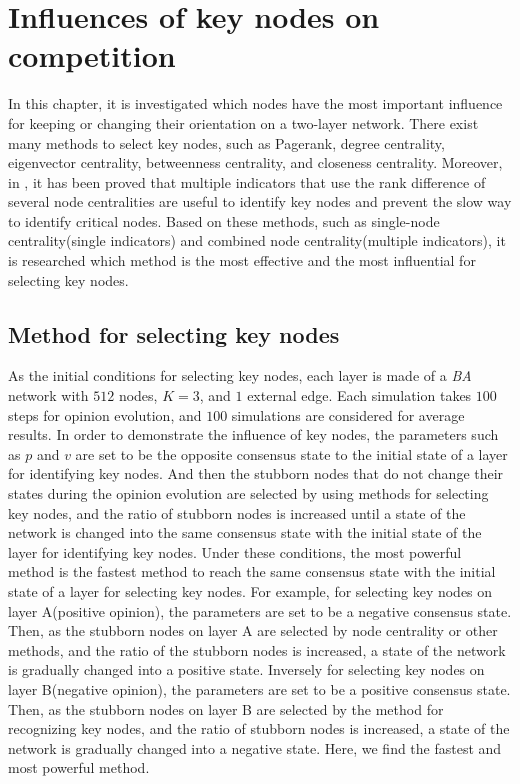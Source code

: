 
\chapter{Influences of key nodes on competition}
\label{chap5}
In this chapter, it is investigated which nodes have the most important influence for keeping or changing their orientation on a two-layer network. There exist many methods to select key nodes, such as Pagerank, degree centrality, eigenvector centrality, betweenness centrality, and closeness centrality. Moreover, in \parencite{mesgari2015, huang2014}, it has been proved that multiple indicators that use the rank difference of several node centralities are useful to identify key nodes and prevent the slow way to identify critical nodes. Based on these methods, such as single-node centrality(single indicators) and combined node centrality(multiple indicators), it is researched which method is the most effective and the most influential for selecting key nodes.  

\section{Method for selecting key nodes}
\label{sec:method for finding key nodes}
As the initial conditions for selecting key nodes, each layer is made of a \textit{BA} network with $512$ nodes, $K=3$, and $1$ external edge. Each simulation takes $100$ steps for opinion evolution, and $100$ simulations are considered for average results. In order to demonstrate the influence of key nodes, the parameters such as $p$ and $v$ are set to be the opposite consensus state to the initial state of a layer for identifying key nodes. And then the stubborn nodes that do not change their states during the opinion evolution are selected by using methods for selecting key nodes, and the ratio of stubborn nodes is increased until a state of the network is changed into the same consensus state with the initial state of the layer for identifying key nodes. Under these conditions, the most powerful method is the fastest method to reach the same consensus state with the initial state of a layer for selecting key nodes. For example, for selecting key nodes on layer A(positive opinion), the parameters are set to be a negative consensus state. Then, as the stubborn nodes on layer A are selected by node centrality or other methods, and the ratio of the stubborn nodes is increased, a state of the network is gradually changed into a positive state. Inversely for selecting key nodes on layer B(negative opinion), the parameters are set to be a positive consensus state. Then, as the stubborn nodes on layer B are selected by the method for recognizing key nodes, and the ratio of stubborn nodes is increased, a state of the network is gradually changed into a negative state. Here, we find the fastest and most powerful method.

